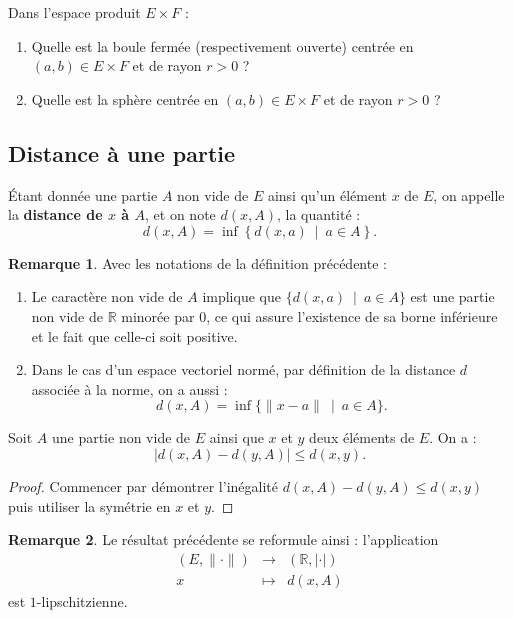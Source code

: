 \documentclass[french]{article}
\newcommand{\R}{\mathbb{R}}
\theoremstyle{plain}
\theoremstyle{definition}
\newtheorem*{rmq}{Remarque}
\theoremstyle{remark}
\begin{document}
\begin{exo}
	Dans l'espace produit $E\times F$ :
	\begin{enumerate}
		\item Quelle est la boule fermée (respectivement ouverte) centrée en $(a,b)\in E\times F$ et de rayon $r>0$ ?
		\item Quelle est la sphère centrée en $(a,b)\in E\times F$ et de rayon $r>0$ ?
	\end{enumerate}
\end{exo}

\subsection{Distance à une partie}

\begin{dfn}
	Étant donnée une partie $A$ non vide de $E$ ainsi qu'un élément $x$ de $E$, on appelle la \textbf{distance de $x$ à $A$}, et on note $d(x,A)$, la quantité : $$d(x,A)=\inf\left\{d(x,a)\ \mid \ a\in A\right\}.$$
\end{dfn}

\begin{rmq}
	Avec les notations de la définition précédente :
	\begin{enumerate}
		\item Le caractère non vide de $A$ implique que $\{d(x,a)\ \mid\ a\in A\}$ est une partie non vide de $\R$ minorée par $0$, ce qui assure l'existence de sa borne inférieure et le fait que celle-ci soit positive.
		\item Dans le cas d'un espace vectoriel normé, par définition de la distance $d$ associée à la norme, on a aussi : $$d(x,A)=\inf\{\lVert x-a\rVert\ \mid\ a\in A\}.$$ 
	\end{enumerate}
\end{rmq}

\begin{prop}%
	Soit $A$ une partie non vide de $E$ ainsi que $x$ et $y$ deux éléments de $E$. On a : $$\lvert d(x,A)-d(y,A)\rvert\leqslant d(x,y).$$
\end{prop}
\begin{proof}
	Commencer par démontrer l'inégalité $d(x,A)-d(y,A)\leqslant d(x,y)$ puis utiliser la symétrie en $x$ et $y$.
\end{proof}

\begin{rmq}
	Le résultat précédente se reformule ainsi : l'application $$\begin{array}{rcl}
		(E,\lVert\cdot\rVert)&\longrightarrow&(\R,\lvert\cdot\rvert)\\
		x&\longmapsto&d(x,A)
	\end{array}$$ est $1$-lipschitzienne.
\end{rmq}
\end{document}
